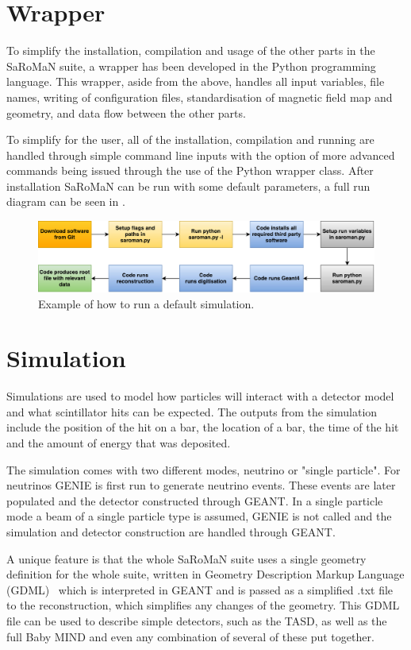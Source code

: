 \section{Wrapper}
To simplify the installation, compilation and usage of the other parts in the SaRoMaN suite, a wrapper has been developed in the Python programming language. This wrapper, aside from the above, handles all input variables, file names, writing of configuration files, standardisation of magnetic field map and geometry, and data flow between the other parts. 

To simplify for the user, all of the installation, compilation and running are handled through simple command line inputs with the option of more advanced commands being issued through the use of the Python wrapper class. After installation SaRoMaN can be run with some default parameters, a full run diagram can be seen in .

\begin{figure}[h!]
\centering
\includegraphics[width=\textwidth]{figures/block.pdf}
\caption{Example of how to run a default simulation.}
\label{fig:block}
\end{figure}

\pagebreak
\section{Simulation}
Simulations are used to model how particles will interact with a detector model and what scintillator hits can be expected. The outputs from the simulation include the position of the hit on a bar, the location of a bar, the time of the hit and the amount of energy that was deposited.

The simulation comes with two different modes, neutrino or "single particle". For neutrinos GENIE is first run to generate neutrino events. These events are later populated and the detector constructed through GEANT. In a single particle mode a beam of a single particle type is assumed, GENIE is not called and the simulation and detector construction are handled through GEANT.

A unique feature is that the whole SaRoMaN suite uses a single geometry definition for the whole suite, written in Geometry Description Markup Language (GDML)~\cite{GDML} which is interpreted in GEANT and is passed as a simplified .txt file to the reconstruction, which simplifies any changes of the geometry. This GDML file can be used to describe simple detectors, such as the TASD, as well as the full Baby MIND and even any combination of several of these put together.


